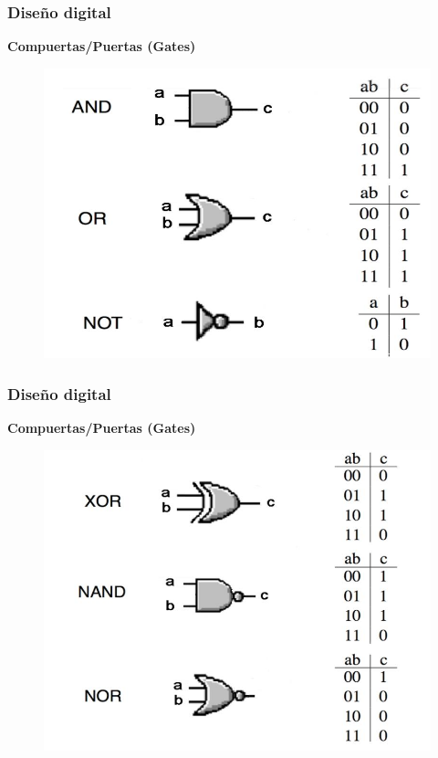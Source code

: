 \documentclass[aspectratio=169,compress]{beamer}
\begin{document}
\begin{footnotesize}
\begin{frame}[fragile]
\frametitle{Diseño digital}
\begin{center}\textbf{Compuertas/Puertas (Gates)}\end{center}
\begin{figure}
\includegraphics[scale=0.2]{images/compuertas.jpg} 
\end{figure}
\end{frame}


\begin{frame}[fragile]
\frametitle{Diseño digital}
\begin{center}\textbf{Compuertas/Puertas (Gates)}\end{center}
\begin{figure}
\includegraphics[scale=0.2]{images/compuertasx.jpg} 
\end{figure}
\end{frame}


\end{footnotesize}
\end{document}
